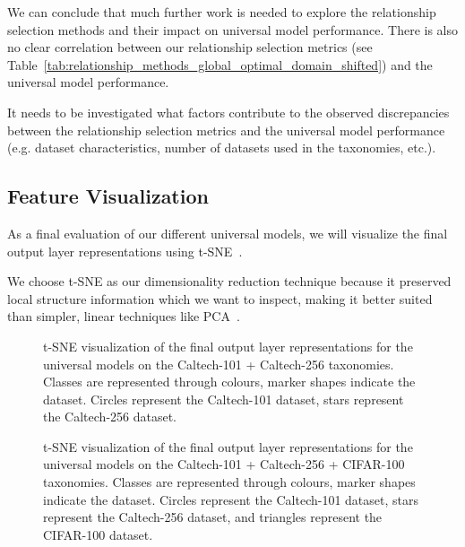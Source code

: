 We can conclude that much further work is needed to explore the relationship selection methods and their impact on universal model performance.
There is also no clear correlation between our relationship selection metrics (see Table~\ref{tab:relationship_methods_global_optimal_domain_shifted})
and the universal model performance.

It needs to be investigated what factors contribute to the observed discrepancies between the relationship selection metrics and the universal model performance
(e.g. dataset characteristics, number of datasets used in the taxonomies, etc.).

\subsection{Feature Visualization}

As a final evaluation of our different universal models,
we will visualize the final output layer representations using t-SNE~\cite{maaten_visualizing_2008}.

We choose t-SNE as our dimensionality reduction technique
because it preserved local structure information which we want to inspect,
making it better suited than simpler, linear techniques like PCA~\cite{gewers_principal_2021}.

\begin{figure}[H]
      \centering
      \resizebox{0.6\textwidth}{!}{}
      \caption{t-SNE visualization of the final output layer representations for the universal models on the Caltech-101 + Caltech-256 taxonomies.
            Classes are represented through colours, marker shapes indicate the dataset.
            Circles represent the Caltech-101 dataset, stars represent the Caltech-256 dataset.}
      \label{fig:universal_features_2domain_tsne}
\end{figure}

\begin{figure}[H]
      \centering
      \resizebox{0.6\textwidth}{!}{}
      \caption{t-SNE visualization of the final output layer representations for the universal models on the Caltech-101 + Caltech-256 + CIFAR-100 taxonomies.
            Classes are represented through colours, marker shapes indicate the dataset.
            Circles represent the Caltech-101 dataset, stars represent the Caltech-256 dataset, and triangles represent the CIFAR-100 dataset.}
      \label{fig:universal_features_3domain_tsne}
\end{figure}

